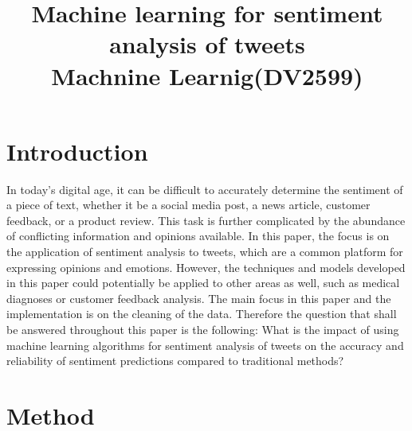\documentclass[conference]{IEEEtran}
\begin{document}


\title{Machine learning for sentiment analysis of tweets\\
{\footnotesize \textsuperscript{}Machnine Learnig(DV2599)}
}

\author{
}
\raggedright
\maketitle

\section{Introduction}
In today's digital age, it can be difficult to accurately determine the sentiment of a piece of text, whether it be a social media post, a news article, customer feedback, or a product review. This task is further complicated by the abundance of conflicting information and opinions available. In this paper, the focus is on the application of sentiment analysis to tweets, which are a common platform for expressing opinions and emotions. However, the techniques and models developed in this paper could potentially be applied to other areas as well, such as medical diagnoses or customer feedback analysis. The main focus in this paper and the implementation is on the cleaning of the data. Therefore the question that shall be answered throughout this paper is the following:
\newline
\newline
What is the impact of using machine learning algorithms for sentiment analysis of tweets on the accuracy and reliability of sentiment predictions compared to traditional methods?


\section{Method}
\end{document}
